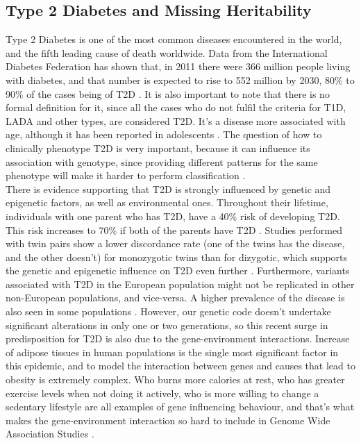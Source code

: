 \subsection{Type 2 Diabetes and Missing Heritability}
Type 2 Diabetes is one of the most common diseases encountered in the world, and the fifth leading cause of death worldwide. Data from the International Diabetes Federation has shown that, in 2011 there were 366 million people living with diabetes, and that number is expected to rise to 552 million by 2030, 80\% to 90\% of the cases being of T2D \cite{sanghera2012type, prasad2015genetics}. It is also important to note that there is no formal definition for it, since all the cases who do not fulfil the criteria for T1D, LADA and other types, are considered T2D. It's a disease more associated with age, although it has been reported in adolescents \cite{vijan2010type}. The question of how to clinically phenotype T2D is very important, because it can influence its association with genotype, since providing different patterns for the same phenotype will make it harder to perform classification \cite{sanghera2012type}. \\
There is evidence supporting that T2D is strongly influenced by genetic and epigenetic factors, as well as environmental ones. Throughout their lifetime, individuals with one parent who has T2D, have a 40\% risk of developing T2D. This risk increases to 70\% if both of the parents have T2D \cite{ali2013genetics,prasad2015genetics}. Studies performed with twin pairs show a lower discordance rate (one of the twins has the disease, and the other doesn't) for monozygotic twins than for dizygotic, which supports the genetic and epigenetic influence on T2D even further \cite{willemsen2015concordance}. Furthermore, variants associated with T2D in the European population might not be replicated in other non-European populations, and vice-versa. A higher prevalence of the disease is also seen in some populations \cite{sanghera2012type, prasad2015genetics, wang2016genetic}. However, our genetic code doesn't undertake significant alterations in only one or two generations, so this recent surge in predisposition for T2D is also due to the gene-environment interactions. Increase of adipose tissues in human populations is the single most significant factor in this epidemic, and to model the interaction between genes and causes that lead to obesity is extremely complex. Who burns more calories at rest, who has greater exercise levels when not doing it actively, who is more willing to change a sedentary lifestyle are all examples of gene influencing behaviour, and that's what makes the gene-environment interaction so hard to include in Genome Wide Association Studies \cite{ali2013genetics}.\\
